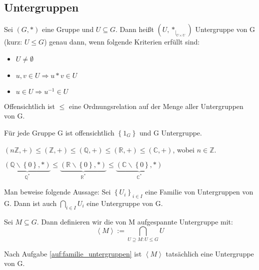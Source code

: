 \documentclass[10pt]{scrbook}
\begin{document}
\subsection{Untergruppen}
\begin{Def}
Sei $(G, *)$ eine Gruppe und $U\subseteq G$. Dann heißt $\left(U, *_{|_{U\times U}}\right)$ Untergruppe von G (kurz: $U\leq G$) genau dann, wenn folgende Kriterien erfüllt sind:
\begin{itemize}
	\item $U\neq \emptyset$
	\item $u, v\in U\Rightarrow u*v\in U$
	\item $u\in U\Rightarrow u^{-1}\in U$
\end{itemize}
\end{Def}

\begin{Bem}Offensichtlich ist $\leq$ eine Ordnungsrelation auf der Menge aller Untergruppen von G.\end{Bem}

\begin{Bem}Für jede Gruppe G ist offensichtlich $\left\{1_G\right\}$ und G Untergruppe.\end{Bem}
\begin{Bsp}$(n\mathbb{Z}, +)\leq (\mathbb{Z}, +)\leq (\mathbb{Q}, +)\leq(\mathbb{R}, +)\leq(\mathbb{C}, +)$, wobei $n\in\mathbb{Z}$.\end{Bsp}
\begin{Bsp}$\underbrace{(\mathbb{Q}\backslash\left\{0\right\}, *)}_{\mathbb{Q}^*}\leq\underbrace{(\mathbb{R}\backslash\left\{0\right\}, *)}_{\mathbb{R}^*}\leq\underbrace{(\mathbb{C}\backslash\left\{0\right\}, *)}_{\mathbb{C}^*}$\end{Bsp}

\begin{Auf}\label{auf:familie_untergruppen}Man beweise folgende Aussage: Sei $\left\{U_i\right\}_{i\in I}$ eine Familie von Untergruppen von G. Dann ist auch $\bigcap\limits_{i\in I}{U_i}$ eine Untergruppe von G.\end{Auf}

\begin{Def}Sei $M\subseteq G$. Dann definieren wir die von M aufgespannte Untergruppe mit:
\begin{displaymath}
\left\langle M \right\rangle:=\bigcap\limits_{U\supseteq M: U\leq G} {U}
\end{displaymath}
\end{Def}
\begin{Bem}Nach Aufgabe \ref{auf:familie_untergruppen} ist $\left\langle M \right\rangle$ tatsächlich eine Untergruppe von G.\end{Bem}
\end{document}
